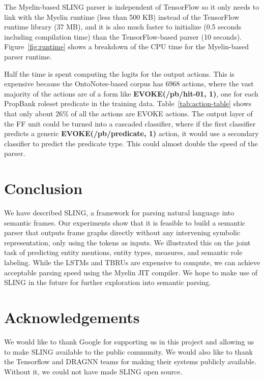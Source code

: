 \documentclass[11pt,a4paper]{article}
\begin{document}
The Myelin-based SLING parser is independent of TensorFlow so it only needs to
link with the Myelin runtime (less than 500 KB) instead of the TensorFlow
runtime library (37 MB), and it is also much faster to initialize (0.5 seconds
including compilation time) than the TensorFlow-based parser (10 seconds).
Figure~\ref{fig:runtime} shows a breakdown of the CPU time for the Myelin-based
parser runtime.

Half the time is spent computing the logits for the output
actions. This is expensive because the OntoNotes-based corpus has 6968 actions,
where the vast majority of the actions are of a form like
{\bf EVOKE(/pb/hit-01, 1)}, one for each PropBank roleset predicate in the
training data. Table~\ref{tab:action-table} shows that only about 26\% of all the
actions are EVOKE actions. The output layer of the FF unit could be turned into
a cascaded classifier, where if the first classifier predicts a generic
{\bf EVOKE(/pb/predicate, 1)} action, it would use a secondary classifier to
predict the predicate type. This could almost double the speed of the parser.

\section{Conclusion}
\label{sec:conclusion}

We have described SLING, a framework for parsing natural language into
semantic frames. Our experiments show that it is feasible to build a
semantic parser that outputs frame graphs directly without any intervening
symbolic representation, only using the tokens as inputs.
We illustrated this on the joint task of predicting entity mentions, entity types,
measures, and semantic role labeling.
While the LSTMs and TBRUs are expensive to compute, we can achieve acceptable
parsing speed using the Myelin JIT compiler.
We hope to make use of SLING in the future for further exploration into
semantic parsing.

\section*{Acknowledgements}
\label{sec:ack}

We would like to thank Google for supporting us in this project and allowing us
to make SLING available to the public community. We would also like to thank the
Tensorflow and DRAGNN teams for making their systems publicly available.
Without it, we could not have made SLING open source.



\end{document}
